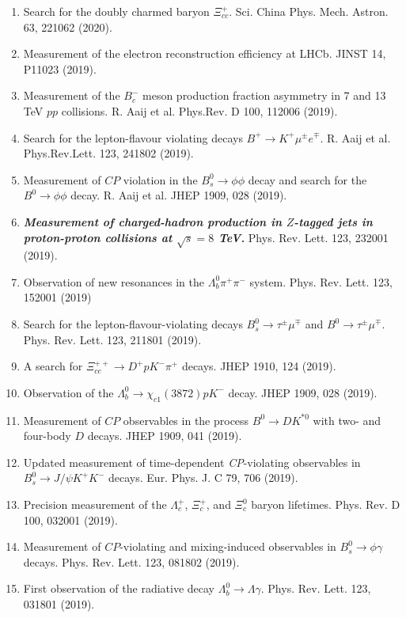 \documentclass[11pt]{article}
\begin{document}
\begin{flushleft}
\begin{center}
\begin{enumerate}
		\item Search for the doubly charmed baryon $\Xi_{cc}^+$. Sci. China Phys. Mech. Astron. 63, 221062 (2020).
		\item Measurement of the electron reconstruction efficiency at LHCb. JINST 14, P11023 (2019).
		\item Measurement of the $B_c^-$ meson production fraction asymmetry in 7 and 13 TeV $pp$ collisions. R. Aaij et al. Phys.Rev. D 100, 112006 (2019).
		\item Search for the lepton-flavour violating decays $B^+\rightarrow K^+\mu^\pm e^\mp$. R. Aaij et al. Phys.Rev.Lett. 123, 241802 (2019).
		\item Measurement of $CP$ violation in the $B_s^0\rightarrow\phi\phi$ decay and search for the $B^0\rightarrow\phi\phi$ decay. R. Aaij et al. JHEP 1909, 028 (2019).
		\item \textbf{\textit{Measurement of charged-hadron production in $Z$-tagged jets in proton-proton collisions at $\sqrt{s}=8$ TeV.}} Phys. Rev. Lett. 123, 232001 (2019).
		\item Observation of new resonances in the $\Lambda_{b}^{0}\pi^+\pi^-$ system. Phys. Rev. Lett. 123, 152001 (2019)
		\item Search for the lepton-flavour-violating decays $B_s^0\rightarrow\tau^\pm\mu^\mp$ and $B^0\rightarrow\tau^\pm\mu^\mp$. Phys. Rev. Lett. 123, 211801 (2019).
		\item A search for $\Xi_{cc}^{++}\rightarrow D^+pK^-\pi^+$ decays. JHEP 1910, 124 (2019).
		\item Observation of the $\Lambda_b^0\rightarrow\chi_{c1}(3872)pK^-$ decay. JHEP 1909, 028 (2019).
		\item Measurement of $CP$ observables in the process $B^0\rightarrow DK^{*0}$ with two- and four-body $D$ decays. JHEP 1909, 041 (2019).
		\item Updated measurement of time-dependent {\it CP}-violating observables in $B_s^0\rightarrow J/\psi K^+K^-$ decays. Eur. Phys. J. C 79, 706 (2019).
		\item Precision measurement of the $\Lambda_c ^+$, $\Xi_c^+$, and $\Xi_c^0$ baryon lifetimes. Phys. Rev. D 100, 032001 (2019).
		\item Measurement of $CP$-violating and mixing-induced observables in $B_s^0\rightarrow\phi\gamma$ decays. Phys. Rev. Lett. 123, 081802 (2019).
		\item First observation of the radiative decay $\Lambda_b^0\rightarrow\Lambda\gamma$. Phys. Rev. Lett. 123, 031801 (2019).

\end{enumerate}
\end{center}
\end{flushleft}
\end{document}
